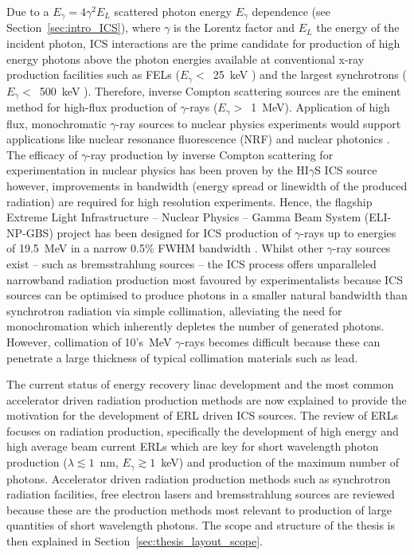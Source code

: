 \documentclass[../main.tex]{subfiles}
\begin{document}
Due to a $E_{\gamma} = 4\gamma^{2}E_{L}$ scattered photon energy $E_{\gamma}$ dependence (see Section~\ref{sec:intro_ICS}), where $\gamma$ is the Lorentz factor and $E_{L}$ the energy of the incident photon, ICS interactions are the prime candidate for production of high energy photons above the photon energies available at conventional x-ray production facilities such as FELs ($E_{\gamma} <$~25~keV \cite{schneidmiller2011photon}) and the largest synchrotrons ($E_{\gamma} <$~500~keV \cite{spring8beamlines}). Therefore, inverse Compton scattering sources are the eminent method for high-flux production of $\gamma$-rays ($E_{\gamma}>$~1~MeV). Application of high flux, monochromatic $\gamma$-ray sources to nuclear physics experiments would support applications like nuclear resonance fluorescence (NRF) \cite{hayakawa2010nondestructive} and nuclear photonics \cite{budker2021expanding}. The efficacy of $\gamma$-ray production by inverse Compton scattering for experimentation in nuclear physics has been proven by the HI$\gamma$S ICS source \cite{weller2009research} however, improvements in bandwidth (energy spread or linewidth of the produced radiation) are required for high resolution experiments. Hence, the flagship Extreme Light Infrastructure -- Nuclear Physics -- Gamma Beam System (ELI-NP-GBS) project \cite{adriani2014technical,elinp2019vega,tanaka2020current} has been designed for ICS production of $\gamma$-rays up to energies of 19.5~\si{\mega\electronvolt} in a narrow 0.5\% FWHM bandwidth \cite{elinp2019vega}. Whilst other $\gamma$-ray sources exist -- such as bremsstrahlung sources -- the ICS process offers unparalleled narrowband radiation production most favoured by experimentalists because ICS sources can be optimised to produce photons in a smaller natural bandwidth than synchrotron radiation via simple collimation, alleviating the need for monochromation which inherently depletes the number of generated photons. However, collimation of 10's~\si{\mega\electronvolt} $\gamma$-rays becomes difficult because these can penetrate a large thickness of typical collimation materials such as lead.  

The current status of energy recovery linac development and the most common accelerator driven radiation production methods are now explained to provide the motivation for the development of ERL driven ICS sources. The review of ERLs focuses on radiation production, specifically the development of high energy and high average beam current ERLs which are key for short wavelength photon production ($\lambda \lesssim 1$~\si{\nano\meter}, $E_{\gamma} \gtrsim 1$~\si{\kilo\electronvolt}) and production of the maximum number of photons. Accelerator driven radiation production methods such as synchrotron radiation facilities, free electron lasers and bremsstrahlung sources are reviewed because these are the production methods most relevant to production of large quantities of short wavelength photons. The scope and structure of the thesis is then explained in Section~\ref{sec:thesis_layout_scope}.    
\end{document}
